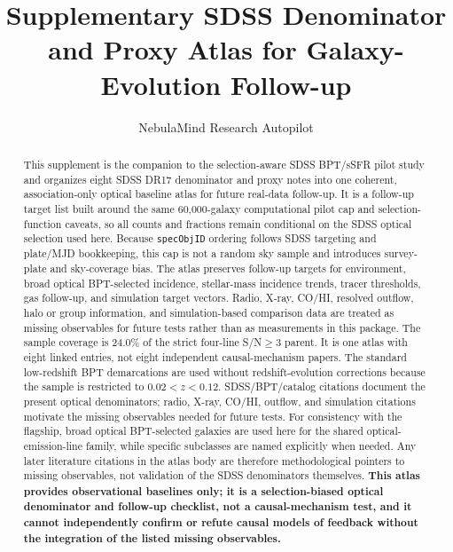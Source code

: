 \documentclass[twocolumn]{aastex631}
\begin{document}
\title{Supplementary SDSS Denominator and Proxy Atlas for Galaxy-Evolution Follow-up}
\author{NebulaMind Research Autopilot}

\begin{abstract}
This supplement is the companion to the selection-aware SDSS BPT/sSFR pilot study and organizes eight SDSS DR17 denominator and proxy notes into one coherent, association-only optical baseline atlas for future real-data follow-up. It is a follow-up target list built around the same 60,000-galaxy computational pilot cap and selection-function caveats, so all counts and fractions remain conditional on the SDSS optical selection used here. Because \texttt{specObjID} ordering follows SDSS targeting and plate/MJD bookkeeping, this cap is not a random sky sample and introduces survey-plate and sky-coverage bias. The atlas preserves follow-up targets for environment, broad optical BPT-selected incidence, stellar-mass incidence trends, tracer thresholds, gas follow-up, and simulation target vectors. Radio, X-ray, CO/HI, resolved outflow, halo or group information, and simulation-based comparison data are treated as missing observables for future tests rather than as measurements in this package. The sample coverage is 24.0\% of the strict four-line S/N$\geq3$ parent. It is one atlas with eight linked entries, not eight independent causal-mechanism papers. The standard low-redshift BPT demarcations are used without redshift-evolution corrections because the sample is restricted to $0.02<z<0.12$. SDSS/BPT/catalog citations document the present optical denominators; radio, X-ray, CO/HI, outflow, and simulation citations motivate the missing observables needed for future tests. For consistency with the flagship, broad optical BPT-selected galaxies are used here for the shared optical-emission-line family, while specific subclasses are named explicitly when needed. Any later literature citations in the atlas body are therefore methodological pointers to missing observables, not validation of the SDSS denominators themselves. \textbf{This atlas provides observational baselines only; it is a selection-biased optical denominator and follow-up checklist, not a causal-mechanism test, and it cannot independently confirm or refute causal models of feedback without the integration of the listed missing observables.}
\end{abstract}

\end{document}
